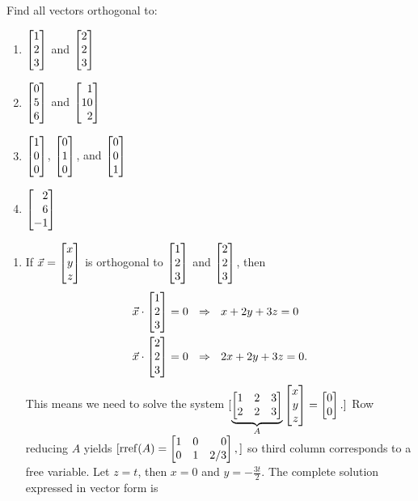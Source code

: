 \begin{exercises}
\begin{problist}
		\prob Find all vectors orthogonal to:
		\begin{enumerate}
			\item $\mat{1\\2\\3}$ and $\mat{2\\2\\3}$
			\item $\mat{0\\5\\6}$ and $\mat{1\\10\\2}$
			\item $\mat{1\\0\\0}$, $\mat{0\\1\\0}$, and $\mat{0\\0\\1}$
			\item $\mat{2\\6\\-1}$
		\end{enumerate}
		\begin{solution}
			\begin{enumerate}
				\item \label{PARTA} If $\vec{x} = \mat{x\\y\\z}$ is orthogonal to $\mat{1\\2\\3}$ and $\mat{2\\2\\3}$, then
				\begin{align*}
					\vec x \cdot \mat{1\\2\\3} &= 0 \ \ \Rightarrow \ \ x+2y+3z = 0 \\
					\vec x \cdot \mat{2\\2\\3} &= 0 \ \ \Rightarrow \ \ 2x+2y+3z = 0.
				\end{align*}
				This means we need to solve the system
				$[
					\underbrace{\mat{1&2&3\\2&2&3}}_{A} \mat{x\\y\\z} = \mat{0\\0}.
				]$
				Row reducing $A$ yields
				$[
					\rref(A) = \mat{1&0&0\\0&1&2/3},
				]$
				so third column corresponds to a free variable. Let $z=t$, then $x=0$ and $y = -\frac{3t}{2}$. The complete solution expressed in vector form is

\end{enumerate}
\end{solution}
\end{problist}
\end{exercises}
